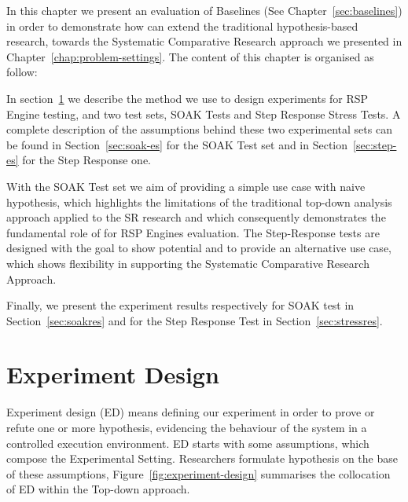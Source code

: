 In this chapter we present an evaluation of \name Baselines (See Chapter~\ref{sec:baselines}) in order to demonstrate how \name can extend the traditional hypothesis-based research, towards the Systematic Comparative Research approach we presented in Chapter~\ref{chap:problem-settings}. The content of this chapter is organised as follow:

In section~\ref{sec:experiment-design} we describe the method we use to design experiments for RSP Engine testing, and two test sets, SOAK Tests and Step Response Stress Tests. A complete description of the assumptions behind these two experimental sets can be found in Section~\ref{sec:soak-es} for the SOAK Test set and in Section~\ref{sec:step-es} for the Step Response one. 

With the SOAK Test set we aim of providing a simple use case with naive hypothesis, which highlights the limitations of the traditional top-down analysis approach applied to the SR research and which consequently demonstrates the fundamental role of \name  for RSP Engines evaluation.  The Step-Response tests are designed with the goal to show \name potential and to provide an alternative use case, which shows \name flexibility in supporting the Systematic Comparative Research Approach.

Finally, we present the experiment results respectively for SOAK test in Section~\ref{sec:soakres} and for the Step Response Test in Section~\ref{sec:stressres}.

\section{Experiment Design}\label{sec:experiment-design}

Experiment design (ED) means defining our experiment in order to prove or refute one or more hypothesis, evidencing the behaviour of the system in a controlled execution environment. ED starts with some assumptions, which compose the  Experimental Setting. Researchers formulate hypothesis on the base of these assumptions, Figure~\ref{fig:experiment-design} summarises the collocation of ED within the Top-down approach.

